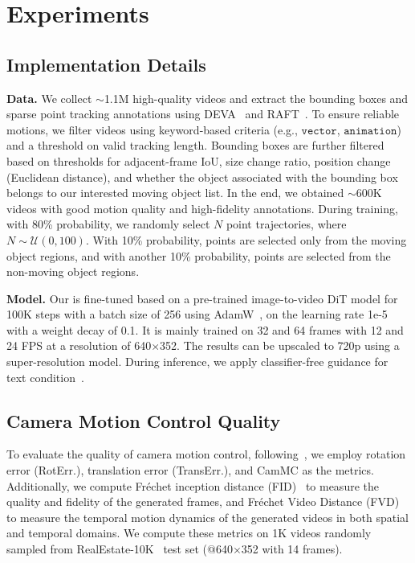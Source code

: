 
\section{Experiments}
\label{sec-5-evaluation}
\subsection{Implementation Details}
\noindent\textbf{Data.} We collect $\sim$1.1M high-quality videos and extract the bounding boxes and sparse point tracking annotations using DEVA~\cite{cheng2023tracking} and RAFT~\cite{teed2020raft}. To ensure reliable motions, we filter videos using keyword-based criteria (e.g., $\texttt{vector}$, $\texttt{animation}$) and a threshold on valid tracking length. Bounding boxes are further filtered based on thresholds for adjacent-frame IoU, size change ratio, position change (Euclidean distance), and whether the object associated with the bounding box belongs to our interested moving object list. In the end, we obtained $\sim$600K videos with good motion quality and high-fidelity annotations. During training, with 80\% probability, we randomly select $N$ point trajectories, where $N \sim \mathcal{U}(0, 100)$. With 10\% probability, points are selected only from the moving object regions, and with another 10\% probability, points are selected from the non-moving object regions.

\noindent\textbf{Model.} Our \MOCA is fine-tuned based on a pre-trained image-to-video DiT model for 100K steps with a batch size of 256 using AdamW~\cite{loshchilov2017decoupled}, on the learning rate 1e-5 with a weight decay of 0.1. It is mainly trained on 32 and 64 frames with 12 and 24 FPS at a resolution of 640$\times$352. The results can be upscaled  to 720p using a super-resolution model. 
During inference, we apply classifier-free guidance for text condition~\cite{ho2022classifier}.




\subsection{Camera Motion Control Quality}
To evaluate the quality of camera motion control, following~\cite{he2024cameractrl,wang2024motionctrl}, we employ rotation error (RotErr.), translation error (TransErr.), and CamMC as the metrics. Additionally, we compute Fr\'echet inception distance (FID)~\cite{heusel2017gans} to measure the quality and fidelity of the generated frames, and Fr\'echet Video Distance (FVD)~\cite{unterthiner2019fvd} to measure the temporal motion dynamics of the generated videos in both spatial and temporal domains. We compute these metrics on 1K videos randomly sampled from RealEstate-10K~\cite{zhou2018stereo} test set (@640$\times$352 with 14 frames).

